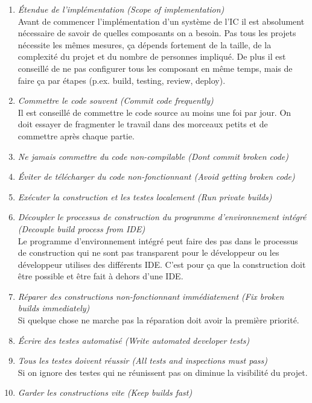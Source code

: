 \begin{enumerate}

\item \textit{Étendue de l'implémentation (Scope of implementation)}\\
Avant de commencer l'implémentation d'un système de l'IC il est absolument nécessaire de savoir de quelles composants on a besoin. Pas tous les projets nécessite les mêmes mesures, ça dépends fortement de la taille, de la complexité du projet et du nombre de personnes impliqué. 
De plus il est conseillé de ne pas configurer tous les composant en même temps, mais de faire ça par étapes (p.ex. build, testing, review, deploy). 

\item\textit{Commettre le code souvent (Commit code frequently)}\\
Il est conseillé de commettre le code source au moins une foi par jour. On doit essayer de fragmenter le travail dans des morceaux petits et de commettre après chaque partie.

\item\textit{Ne jamais commettre du code non-compilable (Dont commit broken code)}

\item\textit{Éviter de télécharger du code non-fonctionnant (Avoid getting broken code)}

\item\textit{Exécuter la construction et les testes localement (Run private builds)}

\item\textit{Découpler le processus de construction du programme d'environnement intégré (Decouple build process from IDE)}\\
Le programme d'environnement intégré peut faire des pas dans le processus de construction qui ne sont pas transparent pour le développeur ou les développeur utilises des différents IDE. C'est pour ça que la construction doit être possible et être fait à dehors d'une IDE.

\item\textit{Réparer des constructions non-fonctionnant immédiatement (Fix broken builds immediately)}\\
Si quelque chose ne marche pas la réparation doit avoir la première priorité.

\item\textit{Écrire des testes automatisé (Write automated developer tests)}

\item\textit{Tous les testes doivent réussir (All tests and inspections must pass)}\\
Si on ignore des testes qui ne réunissent pas on diminue la visibilité du projet.

\item\textit{Garder les constructions vite (Keep builds fast)}\\

\end{enumerate}